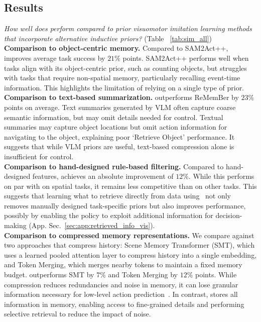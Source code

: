 \subsection{Results}
\textit{How well does \ourmethod{} perform compared to prior visuomotor imitation learning methods that incorporate alternative inductive priors?} (Table ~\ref{tab:sim_all})
\vspace{0.5em}
\\
\textbf{Comparison to object-centric memory.}
Compared to SAM2Act++, \ourmethod{} improves average task success by $21\%$ points.
SAM2Act++ performs well when tasks align with its object-centric prior, such as counting objects, but struggles with tasks that require non-spatial memory, particularly recalling event-time information.
This highlights the limitation of relying on a single type of prior.
\\
\textbf{Comparison to text-based summarization.}
\ourmethod{} outperforms ReMemBer by $23\%$ points on average.
Text summaries generated by VLM often capture coarse semantic information, but may omit details needed for control.
Textual summaries may capture object locations but omit action information for navigating to the object, explaining poor `Retrieve Object' performance.
It suggests that while VLM priors are useful, text-based compression alone is insufficient for control.
\\
\textbf{Comparison to hand-designed rule-based filtering.}
Compared to hand-designed features, \ourmethod{} achieves an absolute improvement of $12\%$.
While this performs on par with \ourmethod{} on spatial tasks, it remains less competitive than \ourmethod{} on other tasks.
This suggests that learning what to retrieve directly from data using~\ourmethod{} not only removes manually designed task-specific priors but also improves performance, possibly by enabling the policy to exploit additional information for decision-making (App. Sec.~\ref{sec:app:retrieved_info_vis}).
\\
\textbf{Comparison to compressed memory representations.}
We compare \ourmethod{} against two approaches that compress history: Scene Memory Transformer (SMT), which uses a learned pooled attention layer to compress history into a single embedding, and Token Merging, which merges nearby tokens to maintain a fixed memory budget.
\ourmethod{} outperforms SMT by $7\%$ and Token Merging by $12\%$ points.
While compression reduces redundancies and noise in memory, it can lose granular information necessary for low-level action prediction~\cite{shao2025tokens}.
In contrast, \ourmethod{} stores all information in memory, enabling access to fine-grained details and performing selective retrieval to reduce the impact of noise.

